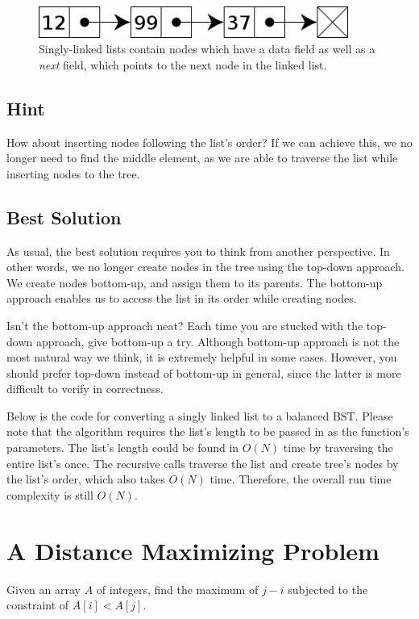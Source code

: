 \documentclass[12pt, reqno, oneside]{amsart}
\begin{document}
\begin{figure}[htbp] %
   \centering
   \includegraphics[width=4in]{figs/Singly-linked-list.png} 
   \caption{Singly-linked lists contain nodes which have a data field as well as a \textit{next} field, which points to the next node in the linked list.}
   \label{fig:Singly-linked-list}
\end{figure}

\subsection{Hint}
How about inserting nodes following the list’s order? If we can achieve this, we no longer need to find the middle element, as we are able to traverse the list while inserting nodes to the tree.

\subsection{Best Solution}
As usual, the best solution requires you to think from another perspective. In other words, we no longer create nodes in the tree using the top-down approach. We create nodes bottom-up, and assign them to its parents. The bottom-up approach enables us to access the list in its order while creating nodes.

Isn’t the bottom-up approach neat? Each time you are stucked with the top-down approach, give bottom-up a try. Although bottom-up approach is not the most natural way we think, it is extremely helpful in some cases. However, you should prefer top-down instead of bottom-up in general, since the latter is more difficult to verify in correctness.

Below is the code for converting a singly linked list to a balanced BST. Please note that the algorithm requires the list’s length to be passed in as the function’s parameters. The list’s length could be found in $O(N)$ time by traversing the entire list’s once. The recursive calls traverse the list and create tree’s nodes by the list’s order, which also takes $O(N)$ time. Therefore, the overall run time complexity is still $O(N)$.




\section{A Distance Maximizing Problem}
Given an array $A$ of integers, find the maximum of $j-i$ subjected to the constraint of $A[i] < A[j]$.
\end{document}
